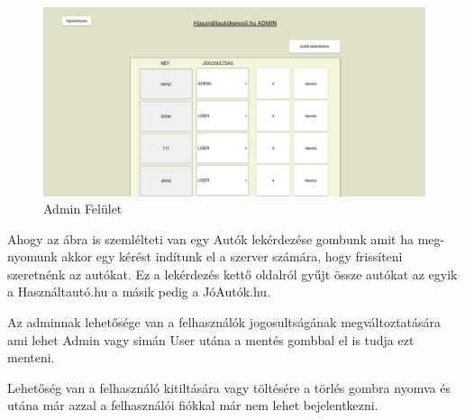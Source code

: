 \begin{figure}[h]
\centering
\includegraphics[scale=0.9]{images/Admin_FE.png}
\caption{Admin Felület}
\label{fig:Admin}
\end{figure}

Ahogy az ábra is szemlélteti van egy Autók lekérdezése gombunk amit ha meg-
nyomunk  akkor egy kérést indítunk el a szerver számára, hogy frissíteni szeretnénk az autókat. Ez a lekérdezés kettő oldalról gyűjt össze autókat az egyik a Használtautó.hu a másik pedig a JóAutók.hu.

Az adminnak lehetősége van a felhasználók jogosultságának megváltoztatására ami lehet Admin vagy simán User utána a mentés gombbal el is tudja ezt menteni.

Lehetőség van a felhasználó kitiltására vagy töltésére a törlés gombra nyomva és utána már azzal a felhasználói fiókkal már nem lehet bejelentkezni.


